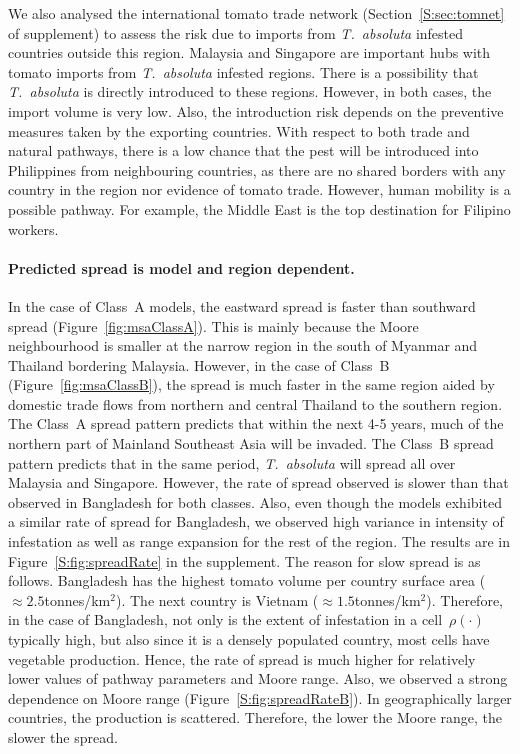 \documentclass[11pt]{article}
\newcommand{\tuta}{\emph{T.~absoluta}}
\newcommand{\infest}{\rho}
\theoremstyle{definition}
\begin{document}
We also analysed the international tomato trade network
(Section~\ref{S:sec:tomnet} of supplement) to assess the risk due to
imports from \tuta{} infested countries outside this region.  Malaysia and
Singapore are important hubs with tomato imports from \tuta{} infested
regions. There is a possibility that \tuta{} is directly introduced to
these regions.  However, in both cases, the import volume is very low.
Also, the introduction risk depends on the preventive measures taken by the
exporting countries. With respect to both trade and natural pathways, there
is a low chance that the pest will be introduced into Philippines from
neighbouring countries, as there are no shared borders with any country in
the region nor evidence of tomato trade. However, human mobility is a
possible pathway. For example, the Middle East is the top destination for
Filipino workers.%
\paragraph{Predicted spread is model and region dependent.} In the case of
Class~A models, the eastward spread is faster than southward spread
(Figure~\ref{fig:msaClassA}). This is mainly because the Moore
neighbourhood is smaller at the narrow region in the south of Myanmar and
Thailand bordering Malaysia.  However, in the case of Class~B
(Figure~\ref{fig:msaClassB}), the spread is much faster in the same region
aided by domestic trade flows from northern and central Thailand to the
southern region. The Class~A spread pattern predicts that within the next
4-5 years, much of the northern part of Mainland Southeast Asia will be
invaded.  The Class~B spread pattern predicts that in the same period,
\tuta{} will spread all over Malaysia and Singapore.  However, the rate of
spread observed is slower than that observed in Bangladesh for both
classes. Also, even though the models exhibited a similar rate of spread
for Bangladesh, we observed high variance in intensity of infestation as
well as range expansion for the rest of the region. The results are in
Figure~\ref{S:fig:spreadRate} in the supplement. The reason for slow spread
is as follows.  Bangladesh has the highest tomato volume per country
surface area ($\approx2.5$tonnes/km$^2$).  The next country is Vietnam
($\approx1.5$tonnes/km$^2$). Therefore, in the case of Bangladesh, not only
is the extent of infestation in a cell~$\infest(\cdot)$ typically high, but
also since it is a densely populated country, most cells have vegetable
production. Hence, the rate of spread is much higher for relatively lower
values of pathway parameters and Moore range. Also, we observed a strong
dependence on Moore range (Figure~\ref{S:fig:spreadRateB}).  In
geographically larger countries, the production is scattered. Therefore,
the lower the Moore range, the slower the spread.
\end{document}
